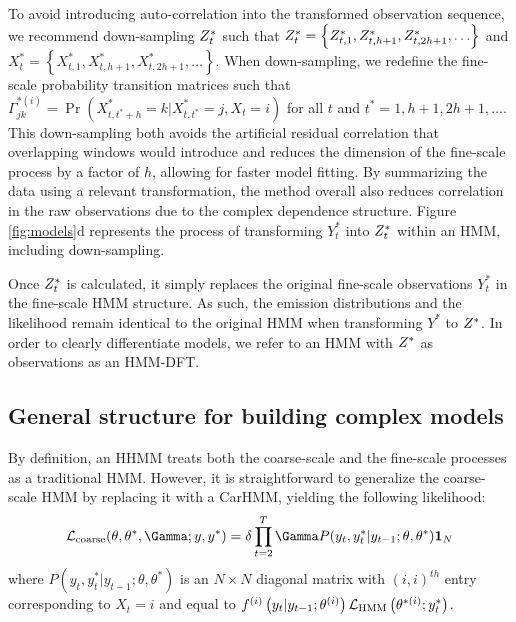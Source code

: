 To avoid introducing auto-correlation into the transformed observation sequence, we recommend down-sampling $Z^*_t$ such that $Z^*_t = \left\{Z^*_{t,1},Z^*_{t,h+1},Z^*_{t,2h+1},\ldots\right\}$ and $X^*_t = \left\{X^*_{t,1},X^*_{t,h+1},X^*_{t,2h+1},\ldots\right\}$. When down-sampling, we redefine the fine-scale probability transition matrices such that $\Gamma^{*(i)}_{jk} = \Pr(X^*_{t,t^*+h} = k | X^*_{t,t^*} = j, X_t = i)$ for all $t$ and $t^* = 1,h+1,2h+1,\ldots$. %
This down-sampling both avoids the artificial residual correlation that overlapping windows would introduce and reduces the dimension of the fine-scale process by a factor of $h$, allowing for faster model fitting. By summarizing the data using a relevant transformation, the method overall also reduces correlation in the raw observations due to the complex dependence structure. Figure \ref{fig:models}d represents the process of transforming $Y^*_{t}$ into $Z^*_{t}$ within an HMM, including down-sampling.

Once $Z^*_t$ is calculated, it simply replaces the original fine-scale observations $Y^*_t$ in the fine-scale HMM structure. As such, the emission distributions and the likelihood remain identical to the original HMM when transforming $Y^*$ to $Z^*$. In order to clearly differentiate models, we refer to an HMM with $Z^*$ as observations as an HMM-DFT.

\subsection{General structure for building complex models}

By definition, an HHMM treats both the coarse-scale and the fine-scale processes as a traditional HMM. However, it is straightforward to generalize the coarse-scale HMM by replacing it with a CarHMM, yielding the following likelihood:
\[
\calL_{\text{coarse}}(\theta,\theta^*,\Gamma;y,y^*) = \delta \prod_{t=2}^T \Gamma P(y_t,y^*_t|y_{t-1};\theta,\theta^*) \mathbf{1}_N
\]
where $P(y_t,y^*_t|y_{t-1};\theta,\theta^*) $ is an $N \times N$ diagonal matrix with $(i,i)^{th}$ entry corresponding to $X_t=i$ and equal to $f^{(i)}\left(y_t|y_{t-1};\theta^{(i)}\right)\mathcal{L}_{\text{HMM}}\left(\theta^{*(i)};y^*_t\right)$. 

